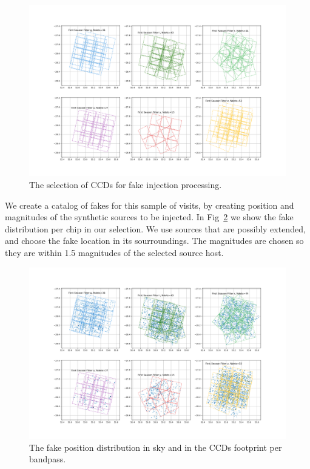 \begin{figure}
    \centering
    \includegraphics[width=0.95\linewidth]{dia/figures/sampled_df_chip_observations.png}
    \caption{The selection of CCDs for fake injection processing.}
    \label{fig:sampled_df_chip_observations}
\end{figure}


We create a catalog of fakes for this sample of visits, by creating position and magnitudes of the synthetic sources to be injected. In Fig~\ref{fig:sampled_df_chip_observations_plusfakes} we show the fake distribution per chip in our selection. We use sources that are possibly extended, and choose the fake location in its sourroundings. The magnitudes are chosen so they are within 1.5 magnitudes of the selected source host.

\begin{figure}
    \centering
    \includegraphics[width=0.95\linewidth]{dia/figures/sampled_df_chip_observations_plusfakes.png}
    \caption{The fake position distribution in sky and in the CCDs footprint per bandpass.}
    \label{fig:sampled_df_chip_observations_plusfakes}
\end{figure}

